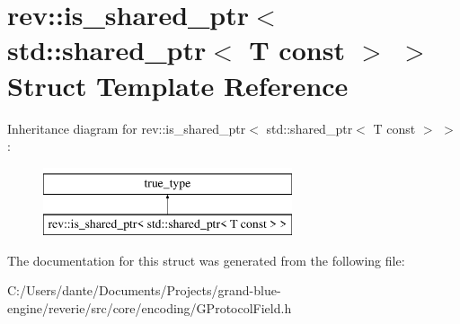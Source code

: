 \hypertarget{structrev_1_1is__shared__ptr_3_01std_1_1shared__ptr_3_01_t_01const_01_4_01_4}{}\section{rev\+::is\+\_\+shared\+\_\+ptr$<$ std\+::shared\+\_\+ptr$<$ T const $>$ $>$ Struct Template Reference}
\label{structrev_1_1is__shared__ptr_3_01std_1_1shared__ptr_3_01_t_01const_01_4_01_4}
Inheritance diagram for rev\+::is\+\_\+shared\+\_\+ptr$<$ std\+::shared\+\_\+ptr$<$ T const $>$ $>$\+:\begin{figure}[H]
\begin{center}
\leavevmode
\includegraphics[height=2.000000cm]{structrev_1_1is__shared__ptr_3_01std_1_1shared__ptr_3_01_t_01const_01_4_01_4}
\end{center}
\end{figure}


The documentation for this struct was generated from the following file\+:\begin{DoxyCompactItemize}
\item 
C\+:/\+Users/dante/\+Documents/\+Projects/grand-\/blue-\/engine/reverie/src/core/encoding/G\+Protocol\+Field.\+h\end{DoxyCompactItemize}

